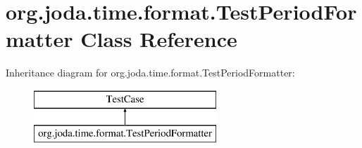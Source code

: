 \hypertarget{classorg_1_1joda_1_1time_1_1format_1_1_test_period_formatter}{\section{org.\-joda.\-time.\-format.\-Test\-Period\-Formatter Class Reference}
\label{classorg_1_1joda_1_1time_1_1format_1_1_test_period_formatter}
}
Inheritance diagram for org.\-joda.\-time.\-format.\-Test\-Period\-Formatter\-:\begin{figure}[H]
\begin{center}
\leavevmode
\includegraphics[height=2.000000cm]{classorg_1_1joda_1_1time_1_1format_1_1_test_period_formatter}
\end{center}
\end{figure}
